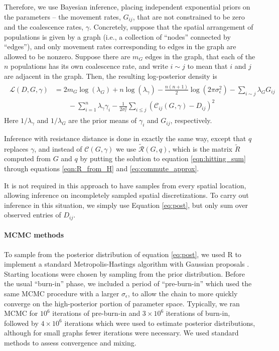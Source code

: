 \documentclass{article}
\newcommand{\comdist}{\widetilde{R}}
\newcommand{\comdistfn}{\widetilde{\mathcal{R}}}
\begin{document}
Therefore, we use Bayesian inference,
placing independent exponential priors on the parameters --
the movement rates, $G_{ij}$, that are not constrained to be zero
and the coalescence rates, $\gamma$.
Concretely, suppose that the spatial arrangement of populations is given by a graph 
(i.e., a collection of ``nodes'' connected by ``edges''),
and only movement rates corresponding to edges in the graph are allowed to be nonzero.
Suppose there are $m_G$ edges in the graph,
that each of the $n$ populations has its own coalescence rate,
and write $i \sim j$ to mean that $i$ and $j$ are adjacent in the graph.
Then, the resulting log-posterior density is
\begin{align} \label{eq:post}
    \begin{split}
\mathcal{L}(D, G, \gamma) 
    &=
    2 m_G \log(\lambda_G) + n \log(\lambda_\gamma) 
    - \frac{n(n+1)}{2} \log(2 \pi \sigma^2_\epsilon)
	- \sum_{i \sim j} \lambda_G G_{ij}  \\
    &\qquad
    -\sum_{i=1}^n \lambda_{\gamma}\gamma_i
		-\frac{1}{2 \sigma_{\epsilon}^2} \sum_{i \leq j} \left(
            \mathcal{C}_{ij}(G,\gamma) - D_{ij}
        \right)^2 
    \end{split}
\end{align}
Here $1/\lambda_\gamma$ and $1/\lambda_G$ are the prior means of $\gamma_i$ and $G_{ij}$,
respectively.

Inference with resistance distance is done in exactly the same way,
except that $q$ replaces $\gamma$,
and instead of $\mathcal{C}(G,\gamma)$ we use $\comdistfn(G, q)$,
which is the matrix $\comdist$ computed from $G$ and $q$ 
by putting the solution to equation \eqref{eqn:hitting_sum}
through equations \eqref{eqn:R_from_H} and \eqref{eq:commute_approx}.

It is not required in this approach to have samples from every spatial location, 
allowing inference on incompletely sampled spatial discretizations.
To carry out inference in this situation,
we simply use Equation \ref{eq:post},
but only sum over observed entries of $D_{ij}$.

\paragraph{MCMC methods}
To sample from the posterior distribution of equation \eqref{eq:post}, 
we used R \citep{Rmanual} 
to implement a standard Metropolis-Hastings algorithm with Gaussian proposals \citep{brooks2011handbook}.
Starting locations were chosen by sampling from the prior distribution.
Before the usual ``burn-in'' phase,
we included a period of ``pre-burn-in'' which used the same MCMC procedure
with a larger $\sigma_\epsilon$, to allow the chain to more quickly converge on the high-posterior
portion of parameter space.
Typically, we ran MCMC for $10^6$ iterations of pre-burn-in 
and $3 \times 10^6$ iterations of burn-in,
followed by $4 \times 10^6$ iterations which were used to estimate posterior distributions,
although for small graphs fewer iterations were necessary.
We used standard methods to assess convergence and mixing.
\end{document}
